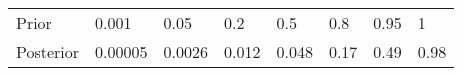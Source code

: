 \begin{table}[ht]
\centering
\begin{tabular}{llllllll}
  \hline
  \hline
Prior & 0.001 & 0.05 & 0.2 & 0.5 & 0.8 & 0.95 &   1 \\ 
  Posterior & 0.00005 & 0.0026 & 0.012 & 0.048 & 0.17 & 0.49 & 0.98 \\ 
   \hline
\end{tabular}
\end{table}
